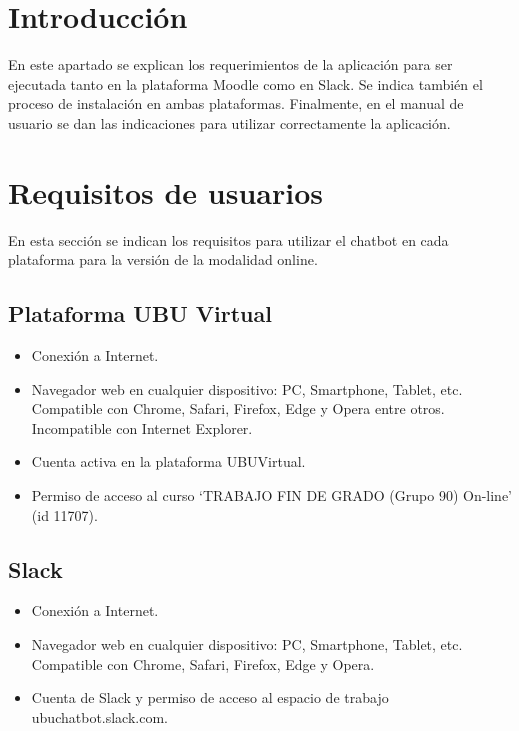 
\section{Introducción}

En este apartado se explican los requerimientos de la aplicación para ser ejecutada tanto en la plataforma Moodle como en Slack. Se indica también el proceso de instalación en ambas plataformas. Finalmente, en el manual de usuario se dan las indicaciones para utilizar correctamente la aplicación.

\section{Requisitos de usuarios}

En esta sección se indican los requisitos para utilizar el chatbot en cada plataforma para la versión de la modalidad online.

\subsection{Plataforma UBU Virtual}

\begin{itemize}
	\tightlist
	\item
	Conexión a Internet.
	\item
	Navegador web en cualquier dispositivo: PC, Smartphone, Tablet, etc. \\
	Compatible con Chrome, Safari, Firefox, Edge y Opera entre otros. Incompatible con Internet Explorer.
	\item
	Cuenta activa en la plataforma UBUVirtual.
	\item
	Permiso de acceso al curso `TRABAJO FIN DE GRADO (Grupo 90) On-line' (id 11707).
	
\end{itemize}

\newpage
\subsection{Slack}	

\begin{itemize}
	\tightlist
	\item
	Conexión a Internet.
	\item
	Navegador web en cualquier dispositivo: PC, Smartphone, Tablet, etc. \\
	Compatible con Chrome, Safari, Firefox, Edge y Opera. \cite{SlackRequisitos}
	\item
	Cuenta de Slack y permiso de acceso al espacio de trabajo ubuchatbot.slack.com. 

\end{itemize}
 
